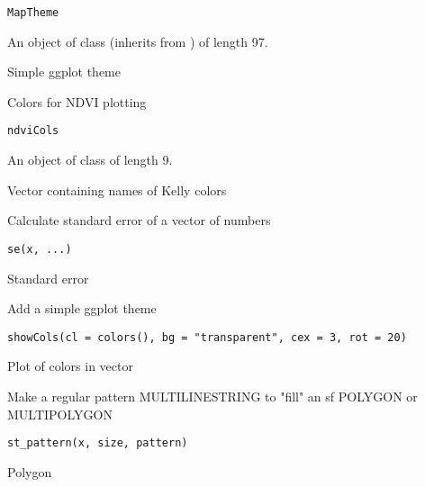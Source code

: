 \documentclass[a4paper]{book}
\begin{document}
%
\begin{Usage}
\begin{verbatim}
MapTheme
\end{verbatim}
\end{Usage}
%
\begin{Format}
An object of class  (inherits from ) of length 97.
\end{Format}
%
\begin{Value}
Simple ggplot theme
\end{Value}
%
\begin{Description}\relax
Colors for NDVI plotting
\end{Description}
%
\begin{Usage}
\begin{verbatim}
ndviCols
\end{verbatim}
\end{Usage}
%
\begin{Format}
An object of class  of length 9.
\end{Format}
%
\begin{Value}
Vector containing names of Kelly colors
\end{Value}
%
\begin{Description}\relax
Calculate standard error of a vector of numbers
\end{Description}
%
\begin{Usage}
\begin{verbatim}
se(x, ...)
\end{verbatim}
\end{Usage}
%
\begin{Value}
Standard error
\end{Value}
%
\begin{Description}\relax
Add a simple ggplot theme
\end{Description}
%
\begin{Usage}
\begin{verbatim}
showCols(cl = colors(), bg = "transparent", cex = 3, rot = 20)
\end{verbatim}
\end{Usage}
%
\begin{Value}
Plot of colors in vector
\end{Value}
%
\begin{Description}\relax
Make a regular pattern MULTILINESTRING to "fill" an sf POLYGON or MULTIPOLYGON
\end{Description}
%
\begin{Usage}
\begin{verbatim}
st_pattern(x, size, pattern)
\end{verbatim}
\end{Usage}
%
\begin{Value}
Polygon
\end{Value}
\printindex{}
\end{document}
